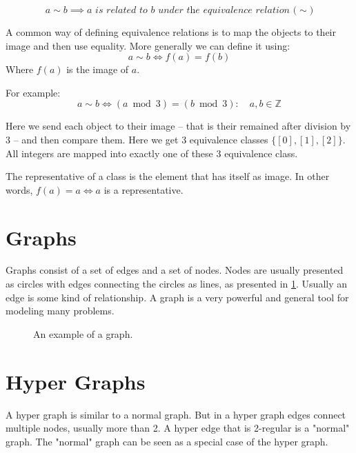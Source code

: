 \documentclass[msc,lith,english]{liuthesis}
\begin{document}
$$
  a \sim b \implies \textit{$a$ is related to $b$ under the equivalence relation ($\sim$)}
$$

A common way of defining equivalence relations is to map the objects to their image and then use equality.
More generally we can define it using:
$$
  a \sim b \iff f(a) = f(b)
$$
Where $f(a)$ is the image of $a$.

For example:
$$
  a \sim b \iff (a \bmod 3) = (b \bmod 3) : \quad a, b \in \mathds{Z}
$$

Here we send each object to their image -- that is their remained after division by 3 -- and then compare them.
Here we get 3 equivalence classes $\{[0], [1], [2]\}$. All integers are mapped into exactly one of these 3 equivalence class.

The representative of a class is the element that has itself as image. In other words, $f(a) = a \iff a$ is a representative.
\cite[Section 7.3]{sourceArmen} \cite[Section 1.2]{sourceAATA}

\section{Graphs}
Graphs consist of a set of edges and a set of nodes.
Nodes are usually presented as circles with edges connecting the circles as lines, as presented in \ref{figGraphExample}.
Usually an edge is some kind of relationship. 
A graph is a very powerful and general tool for modeling many problems.

\begin{center}
\begin{figure}[h]
\centering
{}
  \caption{An example of a graph.}
  \label{figGraphExample}
\end{figure}
\end{center}

\cite[Chapter 1]{sourceDiestel}
\cite[Chapter 1]{sourceGWA}
\cite[Section 9.1]{sourceArmen}


\section{Hyper Graphs}
A hyper graph is similar to a normal graph.
But in a hyper graph edges connect multiple nodes, usually more than 2.
A hyper edge that is 2-regular is a "normal" graph.
The "normal" graph can be seen as a special case of the hyper graph.
\end{document}
